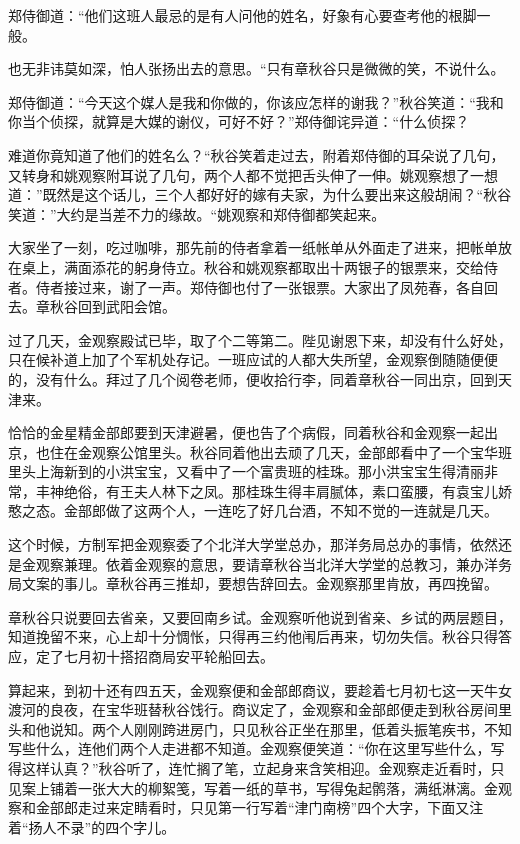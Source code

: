 \documentclass[12pt,UTF8]{ctexbook}
\begin{document}
{{{郑侍御道：“他们这班人最忌的是有人问他的姓名，好象有心要查考他的根脚一般。

也无非讳莫如深，怕人张扬出去的意思。“只有章秋谷只是微微的笑，不说什么。

郑侍御道：“今天这个媒人是我和你做的，你该应怎样的谢我？”秋谷笑道：“我和你当个侦探，就算是大媒的谢仪，可好不好？”郑侍御诧异道：“什么侦探？

难道你竟知道了他们的姓名么？“秋谷笑着走过去，附着郑侍御的耳朵说了几句，又转身和姚观察附耳说了几句，两个人都不觉把舌头伸了一伸。姚观察想了一想道：”既然是这个话儿，三个人都好好的嫁有夫家，为什么要出来这般胡闹？“秋谷笑道：”大约是当差不力的缘故。“姚观察和郑侍御都笑起来。

大家坐了一刻，吃过咖啡，那先前的侍者拿着一纸帐单从外面走了进来，把帐单放在桌上，满面添花的躬身侍立。秋谷和姚观察都取出十两银子的银票来，交给侍者。侍者接过来，谢了一声。郑侍御也付了一张银票。大家出了凤苑春，各自回去。章秋谷回到武阳会馆。

过了几天，金观察殿试已毕，取了个二等第二。陛见谢恩下来，却没有什么好处，只在候补道上加了个军机处存记。一班应试的人都大失所望，金观察倒随随便便的，没有什么。拜过了几个阅卷老师，便收拾行李，同着章秋谷一同出京，回到天津来。

恰恰的金星精金部郎要到天津避暑，便也告了个病假，同着秋谷和金观察一起出京，也住在金观察公馆里头。秋谷同着他出去顽了几天，金部郎看中了一个宝华班里头上海新到的小洪宝宝，又看中了一个富贵班的桂珠。那小洪宝宝生得清丽非常，丰神绝俗，有王夫人林下之凤。那桂珠生得丰肩腻体，素口蛮腰，有袁宝儿娇憨之态。金部郎做了这两个人，一连吃了好几台酒，不知不觉的一连就是几天。

这个时候，方制军把金观察委了个北洋大学堂总办，那洋务局总办的事情，依然还是金观察兼理。依着金观察的意思，要请章秋谷当北洋大学堂的总教习，兼办洋务局文案的事儿。章秋谷再三推却，要想告辞回去。金观察那里肯放，再四挽留。

章秋谷只说要回去省亲，又要回南乡试。金观察听他说到省亲、乡试的两层题目，知道挽留不来，心上却十分惆怅，只得再三约他闱后再来，切勿失信。秋谷只得答应，定了七月初十搭招商局安平轮船回去。

算起来，到初十还有四五天，金观察便和金部郎商议，要趁着七月初七这一天牛女渡河的良夜，在宝华班替秋谷饯行。商议定了，金观察和金部郎便走到秋谷房间里头和他说知。两个人刚刚跨进房门，只见秋谷正坐在那里，低着头振笔疾书，不知写些什么，连他们两个人走进都不知道。金观察便笑道：“你在这里写些什么，写得这样认真？”秋谷听了，连忙搁了笔，立起身来含笑相迎。金观察走近看时，只见案上铺着一张大大的柳絮笺，写着一纸的草书，写得兔起鹘落，满纸淋漓。金观察和金部郎走过来定睛看时，只见第一行写着“津门南榜”四个大字，下面又注着“扬人不录”的四个字儿。

}}}
\end{document}

